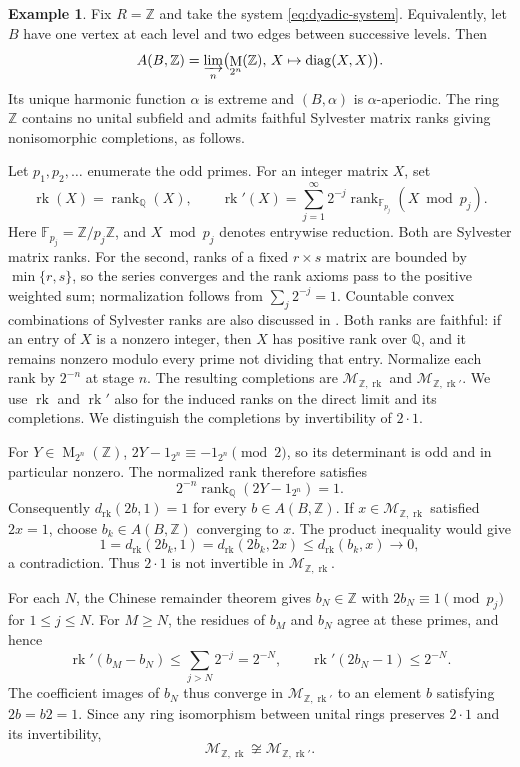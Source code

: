 \documentclass[11pt]{amsart}
\DeclareMathOperator{\rk}{rk}
\DeclareMathOperator{\Mat}{M}
\DeclareMathOperator{\diag}{diag}
\theoremstyle{definition}
\newtheorem{example}[theorem]{Example}
\theoremstyle{remark}
\begin{document}
\begin{example}\label{ex:coefficient-rank-dependence}
Fix $R=\mathbb Z$ and take the system \eqref{eq:dyadic-system}.
Equivalently, let $B$ have one vertex at each level and two edges
between successive levels.  Then
\[
 A(B,\mathbb Z)=\varinjlim_n\bigl(\Mat_{2^n}(\mathbb Z),
             \,X\mapsto\diag(X,X)\bigr).
\]
Its unique harmonic function $\alpha$ is extreme and
$(B,\alpha)$ is $\alpha$-aperiodic.  The ring $\mathbb Z$ contains no
unital subfield and admits faithful Sylvester matrix ranks giving
nonisomorphic completions, as follows.

Let $p_1,p_2,\ldots$ enumerate the odd primes.  For an integer matrix
$X$, set
\[
 \rk(X)=\operatorname{rank}_{\mathbb Q}(X),\qquad
 \rk'(X)=\sum_{j=1}^{\infty}2^{-j}
       \operatorname{rank}_{\mathbb F_{p_j}}(X\bmod p_j).
\]
Here $\mathbb F_{p_j}=\mathbb Z/p_j\mathbb Z$, and
$X\bmod p_j$ denotes entrywise reduction.
Both are Sylvester matrix ranks.  For the second, ranks of a fixed
$r\times s$ matrix are bounded by $\min\{r,s\}$, so the series
converges and the rank axioms pass to the positive weighted sum;
normalization follows from $\sum_j2^{-j}=1$.
Countable convex combinations of Sylvester ranks are also discussed
in \cite[Section~3]{JaikinLopez2020}.
Both ranks are faithful: if an entry of $X$ is a nonzero integer,
then $X$ has positive rank over $\mathbb Q$, and it remains nonzero
modulo every prime not dividing that entry.
Normalize each rank by $2^{-n}$ at stage $n$.  The resulting
completions are $\mathcal M_{\mathbb Z,\rk}$ and $\mathcal M_{\mathbb Z,\rk'}$.
We use $\rk$ and $\rk'$ also for the induced ranks on the direct
limit and its completions.  We distinguish the completions by
invertibility of $2\cdot1$.

For $Y\in\Mat_{2^n}(\mathbb Z)$,
$2Y-1_{2^n}\equiv-1_{2^n}\pmod2$, so its determinant is odd and
in particular nonzero.  The normalized rank therefore satisfies
\[
 2^{-n}\operatorname{rank}_{\mathbb Q}(2Y-1_{2^n})=1.
\]
Consequently $d_{\rk}(2b,1)=1$ for every $b\in A(B,\mathbb Z)$.
If $x\in \mathcal M_{\mathbb Z,\rk}$ satisfied $2x=1$, choose $b_k\in A(B,\mathbb Z)$
converging to $x$.  The product inequality would give
\[
 1=d_{\rk}(2b_k,1)
  =d_{\rk}(2b_k,2x)
  \leq d_{\rk}(b_k,x)\longrightarrow0,
\]
a contradiction.  Thus $2\cdot1$ is not invertible in $\mathcal M_{\mathbb Z,\rk}$.

For each $N$, the Chinese remainder theorem gives $b_N\in\mathbb Z$
with $2b_N\equiv1\pmod{p_j}$ for $1\leq j\leq N$.
For $M\geq N$, the residues of $b_M$ and $b_N$ agree at these primes,
and hence
\[
 \rk'(b_M-b_N)\leq\sum_{j>N}2^{-j}=2^{-N},
 \qquad
 \rk'(2b_N-1)\leq2^{-N}.
\]
The coefficient images of $b_N$ thus converge in $\mathcal M_{\mathbb Z,\rk'}$
to an element $b$ satisfying $2b=b2=1$.  Since any ring isomorphism
between unital rings preserves $2\cdot1$ and its invertibility,
\[
 \mathcal M_{\mathbb Z,\rk}\not\cong \mathcal M_{\mathbb Z,\rk'}.
\]
\end{example}
\end{document}
